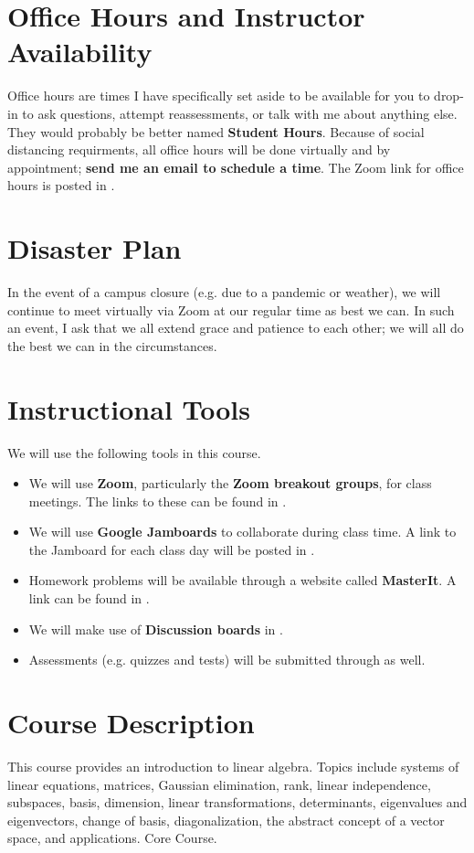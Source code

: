 \documentclass{article}
\begin{document}
\section*{\fontsize{12}{15}\selectfont Office Hours and Instructor Availability}

Office hours are times I have specifically set aside to be available for you to drop-in to ask questions, attempt reassessments, or talk with me about anything else. They would probably be better named \textbf{Student Hours}. Because of social distancing requirments, all office hours will be done virtually and by appointment; {\bf send me an email to schedule a time}. The Zoom link for office hours is posted in \LMS.

\section*{\fontsize{12}{15}\selectfont Disaster Plan}
In the event of a campus closure (e.g. due to a pandemic or weather), we will continue to meet virtually via Zoom at our regular time as best we can. In such an event, I ask that we all extend grace and patience to each other; we will all do the best we can in the circumstances.

\section*{\fontsize{12}{15}\selectfont Instructional Tools}
We will use the following tools in this course.
\begin{itemize}
\item We will use \textbf{Zoom}, particularly the \textbf{Zoom breakout groups}, for class meetings. The links to these can be found in \LMS.
\item We will use \textbf{Google Jamboards} to collaborate during class time. A link to the Jamboard for each class day will be posted in \LMS.
\item Homework problems will be available through a website called \textbf{MasterIt}. A link can be found in \LMS.
\item We will make use of \textbf{Discussion boards} in \LMS. 
\item Assessments (e.g. quizzes and tests) will be submitted through \LMS as well.
\end{itemize}


\section*{\fontsize{12}{15}\selectfont Course Description}
This course provides an introduction to linear algebra. Topics include systems of linear equations, matrices, Gaussian elimination, rank, linear independence, subspaces, basis, dimension, linear transformations, determinants, eigenvalues and eigenvectors, change of basis, diagonalization, the abstract concept of a vector space, and applications. Core Course.
\end{document}
